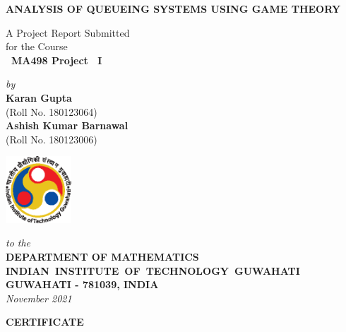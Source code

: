 \documentclass[12pt,a4paper]{report}
\theoremstyle{plain}
\theoremstyle{definition}
\theoremstyle{remark}
\begin{document}


\begin{titlepage}
\enlargethispage{3cm}

\begin{center}

\vspace*{-2cm}

\textbf{\Large ANALYSIS OF QUEUEING SYSTEMS USING GAME THEORY}

\vfill

 A Project Report Submitted \\
for the Course \\[1cm]

{\bf\Large\ MA498 Project ~I }\\[.1in]

 \vfill

{\large \emph{by}}\\[5pt]
{\large\bf {Karan Gupta}}\\[5pt]
{\large (Roll No. 180123064)}\\
{\large\bf {Ashish Kumar Barnawal}}\\[5pt]
{\large (Roll No. 180123006)}

\vfill
\includegraphics[height=2.5cm]{iitglogo}

\vspace*{0.5cm}

{\em\large to the}\\[10pt]
{\bf\large DEPARTMENT OF MATHEMATICS} \\[5pt]
{\bf\large \mbox{INDIAN INSTITUTE OF TECHNOLOGY GUWAHATI}}\\[5pt]
{\bf\large GUWAHATI - 781039, INDIA}\\[10pt]
{\it\large November 2021}
\end{center}

\end{titlepage}

\clearpage

 \setcounter{page}{2}
\begin{center}
{\Large{\bf{CERTIFICATE}}}
\end{center}
\end{document}
